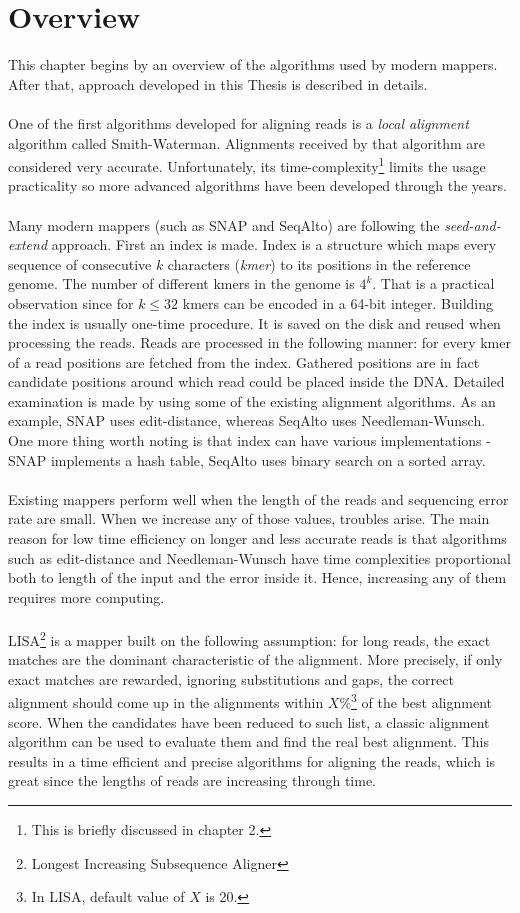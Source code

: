 \documentclass[times, utf8, diplomski]{fer}
\begin{document}
\section{Overview}
This chapter begins by an overview of the algorithms used by modern mappers. After that, approach developed in this Thesis is described in details.\\
\\
One of the first algorithms developed for aligning reads is a \emph{local alignment} algorithm called Smith-Waterman\cite{Smith1981195}. Alignments received by that algorithm are considered very accurate. Unfortunately, its time-complexity\footnote{This is briefly discussed in chapter 2.} limits the usage practicality so more advanced algorithms have been developed through the years.\\
\\
Many modern mappers (such as SNAP\cite{SNAP} and SeqAlto\cite{seqalto}) are following the \emph{seed-and-extend} approach. First an index is made. Index is a structure which maps every sequence of consecutive $k$ characters (\emph{kmer}) to its positions in the reference genome. The number of different kmers in the genome is $4^k$. That is a practical observation since for $k \le 32$ kmers can be encoded in a 64-bit integer. Building the index is usually one-time procedure. It is saved on the disk and reused when processing the reads. Reads are processed in the following manner: for every kmer of a read positions are fetched from the index. Gathered positions are in fact candidate positions around which read could be placed inside the DNA. Detailed examination is made by using some of the existing alignment algorithms. As an example, SNAP uses edit-distance, whereas SeqAlto uses Needleman-Wunsch. One more thing worth noting is that index can have various implementations - SNAP implements a hash table, SeqAlto uses binary search on a sorted array.\\
\\
Existing mappers perform well when the length of the reads and sequencing error rate are small. When we increase any of those values, troubles arise. The main reason for low time efficiency on longer and less accurate reads is that algorithms such as edit-distance and Needleman-Wunsch have time complexities proportional both to length of the input and the error inside it. Hence, increasing any of them requires more computing.\\
\\
LISA\footnote{Longest Increasing Subsequence Aligner} is a mapper built on the following assumption: for long reads, the exact matches are the dominant characteristic of the alignment. More precisely, if only exact matches are rewarded, ignoring substitutions and gaps, the correct alignment should come up in the alignments within $X\%$\footnote{In LISA, default value of $X$ is 20.} of the best alignment score. When the candidates have been reduced to such list, a classic alignment algorithm can be used to evaluate them and find the real best alignment. This results in a time efficient and precise algorithms for aligning the reads, which is great since the lengths of reads are increasing through time.
\end{document}
